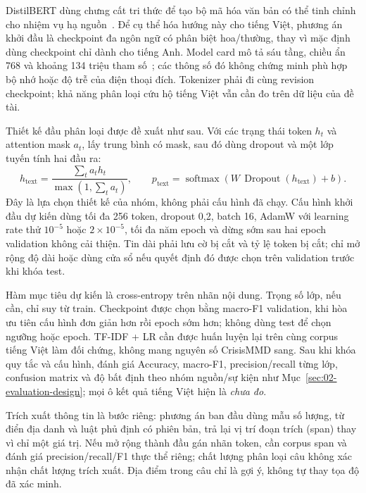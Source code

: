 DistilBERT dùng chưng cất tri thức để tạo bộ mã hóa văn bản có thể tinh chỉnh cho nhiệm vụ hạ nguồn~\citep{sanh2019distilbert}. Để cụ thể hóa hướng này cho tiếng Việt, phương án khởi đầu là checkpoint đa ngôn ngữ có phân biệt hoa/thường, thay vì mặc định dùng checkpoint chỉ dành cho tiếng Anh. Model card mô tả sáu tầng, chiều ẩn 768 và khoảng 134 triệu tham số~\citep{distilbertMultilingualCard}; các thông số đó không chứng minh phù hợp bộ nhớ hoặc độ trễ của điện thoại đích. Tokenizer phải đi cùng revision checkpoint; khả năng phân loại cứu hộ tiếng Việt vẫn cần đo trên dữ liệu của đề tài.

Thiết kế đầu phân loại được đề xuất như sau. Với các trạng thái token $h_t$ và attention mask $a_t$, lấy trung bình có mask, sau đó dùng dropout và một lớp tuyến tính hai đầu ra:
\begin{equation}
 h_{\mathrm{text}}=\frac{\sum_t a_th_t}{\max(1,\sum_t a_t)},\qquad
 p_{\mathrm{text}}=\operatorname{softmax}\!\left(W\,\operatorname{Dropout}(h_{\mathrm{text}})+b\right).
 \label{eq:text-proposed}
\end{equation}
Đây là lựa chọn thiết kế của nhóm, không phải cấu hình đã chạy. Cấu hình khởi đầu dự kiến dùng tối đa 256 token, dropout 0,2, batch 16, AdamW với learning rate thử $10^{-5}$ hoặc $2\times10^{-5}$, tối đa năm epoch và dừng sớm sau hai epoch validation không cải thiện. Tin dài phải lưu cờ bị cắt và tỷ lệ token bị cắt; chỉ mở rộng độ dài hoặc dùng cửa sổ nếu quyết định đó được chọn trên validation trước khi khóa test.

Hàm mục tiêu dự kiến là cross-entropy trên nhãn nội dung. Trọng số lớp, nếu cần, chỉ suy từ train. Checkpoint được chọn bằng macro-F1 validation, khi hòa ưu tiên cấu hình đơn giản hơn rồi epoch sớm hơn; không dùng test để chọn ngưỡng hoặc epoch. TF-IDF + LR cần được huấn luyện lại trên cùng corpus tiếng Việt làm đối chứng, không mang nguyên số CrisisMMD sang. Sau khi khóa quy tắc và cấu hình, đánh giá Accuracy, macro-F1, precision/recall từng lớp, confusion matrix và độ bất định theo nhóm nguồn/sự kiện như Mục~\ref{sec:02-evaluation-design}; mọi ô kết quả tiếng Việt hiện là \emph{chưa đo}.

Trích xuất thông tin là bước riêng: phương án ban đầu dùng mẫu số lượng, từ điển địa danh và luật phủ định có phiên bản, trả lại vị trí đoạn trích (span) thay vì chỉ một giá trị. Nếu mở rộng thành đầu gán nhãn token, cần corpus span và đánh giá precision/recall/F1 thực thể riêng; chất lượng phân loại câu không xác nhận chất lượng trích xuất. Địa điểm trong câu chỉ là gợi ý, không tự thay tọa độ đã xác minh.

